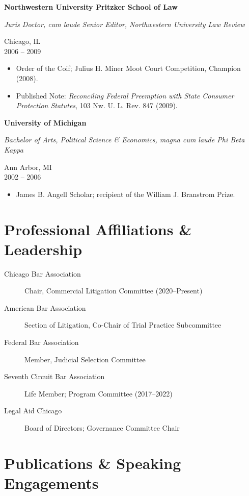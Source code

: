\documentclass[11pt,a4paper]{article}
\newcommand{\cvsection}[1]{%
  \vspace{0.3em}
  \section{#1}
  \vspace{0.1em}
}
\newcommand{\educationentry}[4]{%
  \vspace{0.3em}
  \noindent
  \begin{minipage}[t]{0.72\textwidth}
    {\bfseries\color{Navy} #1}\par
    {\itshape\color{Burgundy} #2}
  \end{minipage}%
  \hfill%
  \begin{minipage}[t]{0.26\textwidth}
    \raggedleft
    \small\color{MidGray} #3 \\[0.15em]
    {\footnotesize\color{MidGray} #4}
  \end{minipage}
  \par
  \vspace{0.25em}
}
\begin{document}
\educationentry
  {Northwestern University Pritzker School of Law}
  {Juris Doctor, \textit{cum laude} \textbar{} Senior Editor, Northwestern University Law Review}
  {Chicago, IL}
  {2006 -- 2009}

\vspace{0.15em}
\begin{itemize}
  \item Order of the Coif; Julius H. Miner Moot Court Competition, Champion (2008).
  \item Published Note: \textit{Reconciling Federal Preemption with State Consumer Protection
        Statutes}, 103 Nw. U. L. Rev. 847 (2009).
\end{itemize}

\vspace{0.55em}

\educationentry
  {University of Michigan}
  {Bachelor of Arts, Political Science \& Economics, \textit{magna cum laude} \textbar{} Phi Beta Kappa}
  {Ann Arbor, MI}
  {2002 -- 2006}

\vspace{0.15em}
\begin{itemize}
  \item James B. Angell Scholar; recipient of the William J. Branstrom Prize.
\end{itemize}

\cvsection{Professional Affiliations \& Leadership}

\vspace{0.25em}
\begin{description}
  \item[Chicago Bar Association] Chair, Commercial Litigation Committee (2020--Present)
  \item[American Bar Association] Section of Litigation, Co-Chair of Trial Practice Subcommittee
  \item[Federal Bar Association] Member, Judicial Selection Committee
  \item[Seventh Circuit Bar Association] Life Member; Program Committee (2017--2022)
  \item[Legal Aid Chicago] Board of Directors; Governance Committee Chair
\end{description}

\cvsection{Publications \& Speaking Engagements}
\end{document}

